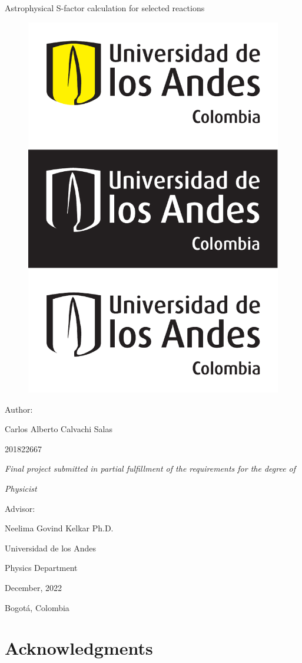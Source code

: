 \documentclass[openany]{book}
\begin{document}
		\begin{titlepage}
		\centering
		
		{\Huge Astrophysical S-factor calculation for selected reactions  \par}
		
		\begin{figure}[H]
			\centering
			\includegraphics[width=0.5\linewidth]{logo.pdf}
			\label{fig:logo}
		\end{figure}
		{\Large Author:  \par}
		{\Large Carlos Alberto Calvachi Salas \par}
		{\Large 201822667 \par}
		\vfill
		{\Large\textit{Final project submitted in partial fulfillment of the requirements for the degree of} \par}
		\vfill
		{\Large\textit{Physicist} \par}
		\vfill
		{\Large Advisor:  \par}
		{\Large Neelima Govind Kelkar Ph.D. \par}
		\vfill
		{\Large Universidad de los Andes  \par}
		{\Large Physics Department  \par}
		{\Large December, 2022  \par}
		{\Large Bogotá, Colombia \par}
	\end{titlepage}


\chapter*{Acknowledgments}
\end{document}
